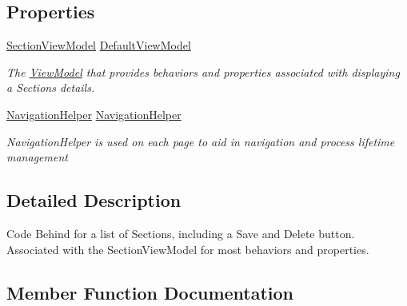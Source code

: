 \subsection*{Properties}
\begin{DoxyCompactItemize}
\item 
\hyperlink{class_listen_to_me_1_1_view_model_1_1_section_view_model}{Section\+View\+Model} \hyperlink{class_listen_to_me_1_1_view_1_1_section_details_a4617900ee574b4b8b2fb23d1f11eb7d2}{Default\+View\+Model}
\begin{DoxyCompactList}\small\item\em The \hyperlink{namespace_listen_to_me_1_1_view_model}{View\+Model} that provides behaviors and properties associated with displaying a Section\textquotesingle{}s details. \end{DoxyCompactList}\item 
\hyperlink{class_listen_to_me_1_1_common_1_1_navigation_helper}{Navigation\+Helper} \hyperlink{class_listen_to_me_1_1_view_1_1_section_details_a4712dad29872447f222e969ba956759e}{Navigation\+Helper}
\begin{DoxyCompactList}\small\item\em Navigation\+Helper is used on each page to aid in navigation and process lifetime management \end{DoxyCompactList}\end{DoxyCompactItemize}


\subsection{Detailed Description}
Code Behind for a list of Sections, including a Save and Delete button. Associated with the Section\+View\+Model for most behaviors and properties. 



\subsection{Member Function Documentation}
